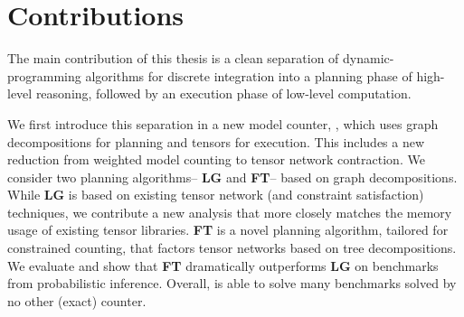 



\section{Contributions}

The main contribution of this thesis is a clean separation of dynamic-programming algorithms for discrete integration into a planning phase of high-level reasoning, followed by an execution phase of low-level computation.

We first introduce this separation in a new model counter, , which uses graph decompositions for planning and tensors for execution. This includes a new reduction from weighted model counting to tensor network contraction. We consider two planning algorithms-- \textbf{LG} and \textbf{FT}-- based on graph decompositions. While \textbf{LG} is based on existing tensor network (and constraint satisfaction) techniques, we contribute a new analysis that more closely matches the memory usage of existing tensor libraries. \textbf{FT} is a novel planning algorithm, tailored for constrained counting, that factors tensor networks based on tree decompositions. We evaluate  and show that \textbf{FT} dramatically outperforms \textbf{LG} on benchmarks from probabilistic inference. Overall,  is able to solve many benchmarks solved by no other (exact) counter.


